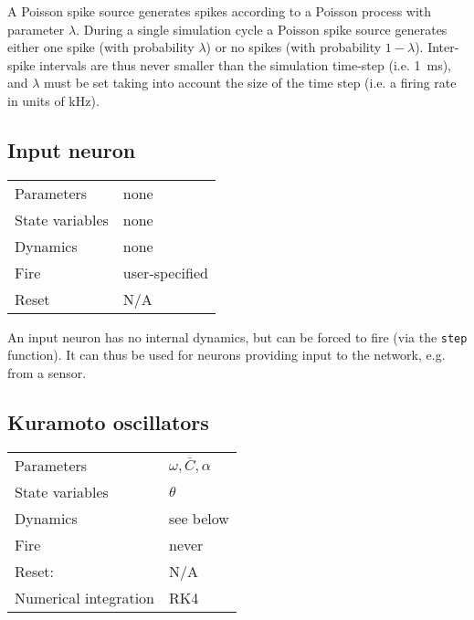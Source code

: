 \documentclass[a4paper]{article}
\newcommand{\code}[1]{\texttt{#1}}
\begin{document}
A Poisson spike source generates spikes according to a Poisson process with
parameter $\lambda$. During a single simulation cycle a Poisson spike source
generates either one spike (with probability $\lambda$) or no spikes (with
probability $1 - \lambda$). Inter-spike intervals are thus never smaller than
the simulation time-step (i.e.  \SI{1}{\milli \second}), and $\lambda$ must be
set taking into account the size of the time step (i.e. a firing rate in units
of \si{\kilo \hertz}).


\subsection{Input neuron}
\label{model:neuron:input}

\begin{tabular}{ll}
Parameters	    & none           \\
State variables & none           \\
Dynamics        & none           \\
Fire            & user-specified \\
Reset           & N/A            \\
\end{tabular}

An input neuron has no internal dynamics, but can be forced to fire (via the
\code{step} function). It can thus be used for neurons providing input to the
network, e.g. from a sensor.

\subsection{Kuramoto oscillators}
\label{model:neuron:kuramoto}


\begin{tabular}{ll}
Parameters      & $\omega, \bar{C}, \alpha$ \\
State variables & $\theta$                  \\
Dynamics        & see below                 \\
Fire            & never                     \\
Reset:          & N/A                       \\
Numerical integration & RK4                 \\
\end{tabular}
\end{document}
